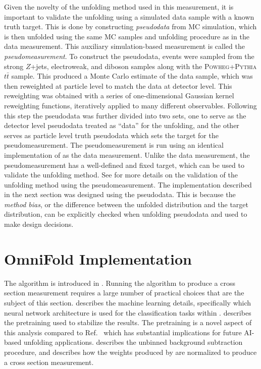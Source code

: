 Given the novelty of the unfolding method used in this measurement, it is important to validate the unfolding using a simulated data sample with a known truth target.
This is done by constructing \textit{pseudodata} from MC simulation, which is then unfolded using the same MC samples and unfolding procedure as in the data measurement.
This auxiliary simulation-based measurement is called the \textit{pseudomeasurement}.
To construct the pseudodata, events were sampled from the \sherpa strong $Z$+jets, electroweak, and diboson samples along with the \textsc{Powheg}+\textsc{Pythia} $t\bar{t}$ sample.
This produced a Monte Carlo estimate of the data sample, which was then reweighted at particle level to match the data at detector level.
This reweighting was obtained with a series of one-dimensional Gaussian kernel reweighting functions, iteratively applied to many different observables.
Following this step the pseudodata was further divided into two sets, one to serve as the detector level pseudodata treated as ``data'' for the unfolding, and the other serves as particle level truth pseudodata which sets the target for the pseudomeasurement.
The pseudomeasurement is run using an identical implementation of \Omnifold as the data measurement.
Unlike the data measurement, the pseudomeasurement has a well-defined and fixed target, which can be used to validate the unfolding method.
See  for more details on the validation of the unfolding method using the pseudomeasurement.
The \Omnifold implementation described in the next section was designed using the pseudodata.
This is because the \textit{method bias}, or the difference between the unfolded distribution and the target distribution, can be explicitly checked when unfolding pseudodata and used to make design decisions.

\FloatBarrier

\section{OmniFold Implementation}
\label{sec:zjets-omnifold}

The \Omnifold algorithm is introduced in .
Running the algorithm to produce a cross section measurement requires a large number of practical choices that are the subject of this section.
 describes the machine learning details, specifically which neural network architecture is used for the classification tasks within \Omnifold.
 describes the pretraining used to stabilize the results.
The pretraining is a novel aspect of this analysis compared to Ref.~\cite{ATLAS:2024xxl} which has substantial implications for future AI-based unfolding applications.
 describes the unbinned background subtraction procedure, and  describes how the weights produced by \Omnifold are normalized to produce a cross section measurement.

